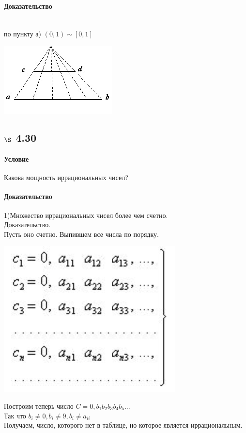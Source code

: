 \documentclass[a4paper,12pt]{article}
\begin{document}
\paragraph*{Доказательство}\mbox{}\\
по пункту а) $\left( 0, 1\right)  \sim \left[  0, 1 \right]$\\ 
\begin{center}
  \includegraphics[scale=0.7]{image007.jpg}
\end{center}

\subsection*{$\S$ 4.30}
\paragraph*{Условие}
Какова мощность иррациональных чисел?
\paragraph*{Доказательство}
1)Множество иррациональных чисел более чем счетно.\\
Доказательство.\\
Пусть оно счетно. Выпившем все числа по порядку.\\
\begin{center}
  \includegraphics[scale=0.7]{image006.png}
\end{center}
Построим теперь число $C=0, b_1 b_2 b_3 b_4 b_5...$\\
Так что $b_i \neq 0, b_i \neq 9, b_i \neq a_{ii}$\\
Получаем, число, которого нет в таблице, но которое является иррациональным.   
\end{document}
